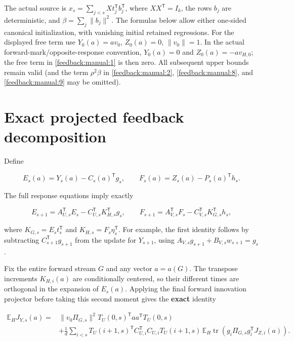 \documentclass[11pt,oneside,openany,a4paper]{book}
\numberwithin{equation}{chapter}
\theoremstyle{definition}
\theoremstyle{remark}
\begin{document}
The actual source is \(x_s=\sum_{j<s}Xt_j^{\mathsf T}b_j^{\mathsf T}\), where \(XX^{\mathsf T}=I_k\), the rows \(b_j\) are deterministic, and \(\beta=\sum_j\|b_j\|^2\). The formulas below allow either one-sided canonical initialization, with vanishing initial retained regressions. For the displayed free term use \(Y_0(a)=av_0\), \(Z_0(a)=0\), \(\|v_0\|=1\). In the actual forward-mark/opposite-response convention, \(Y_0(a)=0\) and \(Z_0(a)=-av_{H,0}\); the free term in \eqref{feedback:manual:1} is then zero. All subsequent upper bounds remain valid (and the term \(\rho^2\beta\) in \eqref{feedback:manual:2}, \eqref{feedback:manual:8}, and \eqref{feedback:manual:9} may be omitted).

\section{Exact projected feedback decomposition}\label{feedback:exact-projected-feedback-decomposition}

Define

\[
E_s(a)=Y_s(a)-C_s(a)^{\mathsf T}g_s,
\qquad F_s(a)=Z_s(a)-P_s(a)^{\mathsf T}h_s.
\]

The full response equations imply exactly

\[
E_{s+1}=A_{U,s}^{\mathsf T}E_s-C_{U,s}^{\mathsf T}K_{H,s}^{\mathsf T}g_s,
\qquad
F_{s+1}=A_{V,s}^{\mathsf T}F_s-C_{V,s}^{\mathsf T}K_{G,s}^{\mathsf T}h_s,
\]

where \(K_{G,s}=E_st_s^{\mathsf T}\) and \(K_{H,s}=F_s\eta_s^{\mathsf T}\). For example, the first identity follows by subtracting \(C_{s+1}^{\mathsf T}g_{s+1}\) from the update for \(Y_{s+1}\), using \(A_{V,s}g_{s+1}+B_{V,s}w_{s+1}=g_s\).

Fix the entire forward stream \(G\) and any vector \(a=a(G)\). The transpose increments \(K_{H,i}(a)\) are conditionally centered, so their different times are orthogonal in the expansion of \(E_s(a)\). Applying the final forward innovation projector before taking this second moment gives the \textbf{exact} identity

\[
\begin{split}
\mathbb E_H J_{Y,s}(a)
={}&\|v_0\Pi_{G,s}\|^2T_U(0,s)^{\mathsf T}aa^{\mathsf T}T_U(0,s)\\
&+\frac1d\sum_{i<s}T_U(i+1,s)^{\mathsf T}C_{U,i}^{\mathsf T}C_{U,i}T_U(i+1,s)\,
\mathbb E_H\operatorname{tr}\!\left(g_i\Pi_{G,s}g_i^{\mathsf T}J_{Z,i}(a)\right).
\end{split}\tag{\thechapter.1}\label{feedback:manual:1}
\]
\end{document}
